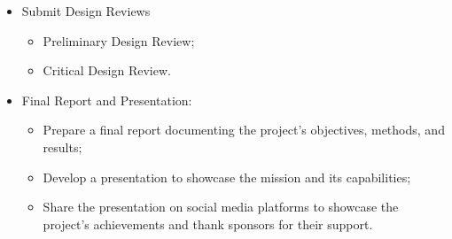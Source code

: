 \begin{itemize}[leftmargin=1cm, itemindent=0.25cm, noitemsep, topsep=0pt, label=$\bullet$]
\begin{itemize}[label=, noitemsep, topsep=0pt]
    \end{itemize}
    \item Submit Design Reviews
    \begin{itemize}[label=, noitemsep, topsep=0pt]
        \item Preliminary Design Review;
        \item Critical Design Review.
    \end{itemize}
    \item Final Report and Presentation:
    \begin{itemize}[label=, noitemsep, topsep=0pt]
    \item Prepare a final report documenting the project's objectives, methods, and results;
    \item Develop a presentation to showcase the mission and its capabilities;
    \item Share the presentation on social media platforms to showcase the project's achievements and thank sponsors for their support.
    \end{itemize}
\end{itemize}